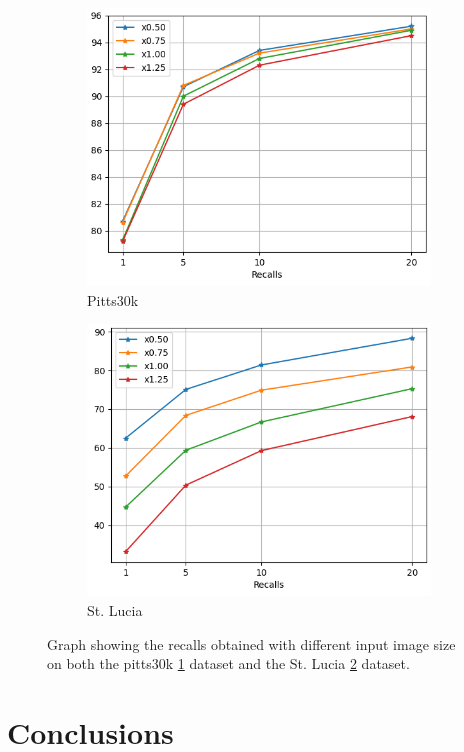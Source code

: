 \documentclass[10pt,twocolumn,letterpaper]{article}
\begin{document}
\begin{figure}
   \centering
   \begin{subfigure}[b]{0.23\textwidth}
      \centering
      \includegraphics[width=\textwidth]{img/resize/test_pitts30k_recalls_graph.png}
      \caption{Pitts30k}
      \label{fig:recalls:resize:pitts30k}
   \end{subfigure}
   \hfill
   \begin{subfigure}[b]{0.23\textwidth}
      \centering
      \includegraphics[width=\textwidth]{img/resize/test_st_lucia_recalls_graph.png}
      \caption{St. Lucia}
      \label{fig:recalls:resize:st_lucia}
   \end{subfigure}
   \caption{Graph showing the recalls obtained with different input image size on both the pitts30k \ref{fig:recalls:resize:pitts30k} dataset and the St. Lucia \ref{fig:recalls:resize:st_lucia} dataset.}
   \label{fig:recalls:resize}
\end{figure}

\section{Conclusions}

{\small


}
\end{document}
